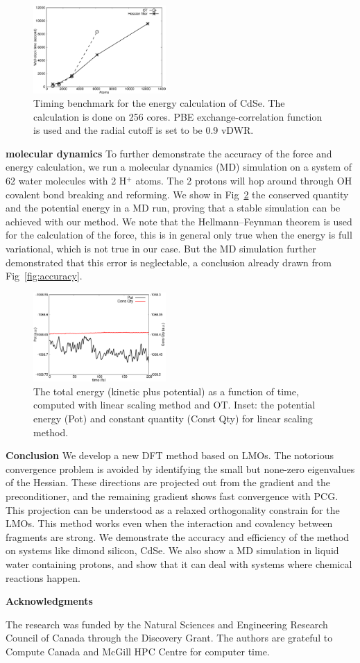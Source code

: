 \documentclass[prl,twocolumn,showpacs]{revtex4}
\begin{document}
\begin{figure}
\includegraphics[width=0.45\textwidth]{timing}
\caption{Timing benchmark for the energy calculation of CdSe. The calculation is done on 256 cores. PBE exchange-correlation function is used and the radial cutoff is set to be 0.9 vDWR.}
\label{fig:scaling}
\end{figure}



\textbf{molecular dynamics}
To further demonstrate the accuracy of the force and energy calculation, we run a molecular dynamics (MD) simulation on a system of 62 water molecules with 2 H$^+$ atoms. The 2 protons will hop around through OH covalent bond breaking and reforming. We show in Fig~\ref{fig:md} the conserved quantity and the potential energy in a MD run, proving that a stable simulation can be achieved with our method. We note that the Hellmann–Feynman theorem\cite{feynman1939forces} is used for the calculation of the force, this is in general only true when the energy is full variational, which is not true in our case. But the MD simulation further demonstrated that this error is neglectable, a conclusion already drawn from Fig~\ref{fig:accuracy}.

\begin{figure}
\includegraphics[width=0.45\textwidth]{const}
\caption{The total energy (kinetic plus potential) as a function of time, computed with linear scaling method and OT. Inset: the potential energy (Pot) and constant quantity (Const Qty) for linear scaling method.}
\label{fig:md}
\end{figure}

\textbf{Conclusion} We develop a new DFT method based on LMOs. The notorious convergence problem is avoided by identifying the small but none-zero eigenvalues of the Hessian. These directions are projected out from the gradient and the preconditioner, and the remaining gradient shows fast convergence with PCG. This projection can be understood as a relaxed orthogonality constrain for the LMOs. This method works even when the interaction and covalency between fragments are strong. We demonstrate the accuracy and efficiency of the method on systems like dimond silicon, CdSe. We also show a MD simulation in liquid water containing protons, and show that it can deal with systems where chemical reactions happen.


\textbf{Acknowledgments} 

The research was funded by the Natural Sciences and Engineering Research Council of Canada through the Discovery Grant. The authors are grateful to Compute Canada and McGill HPC Centre for computer time.


\end{document}
